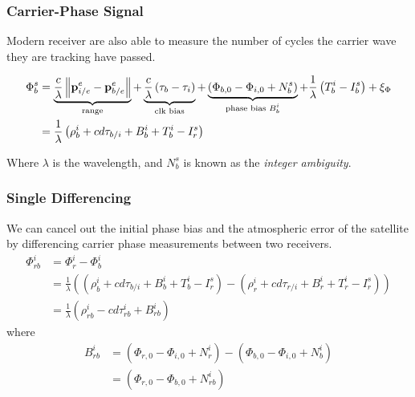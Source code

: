 \documentclass{beamer}
\newcommand{\norm}[1]{\left\lVert#1\right\rVert}
\begin{document}
\begin{frame}\frametitle{Carrier-Phase Signal}
Modern receiver are also able to measure the number of cycles the carrier wave they are tracking have passed.

\begin{align}
\Phi_{b}^s&=\underbrace{\frac{c}{\lambda}\norm{\p_{i/e}^{e}-\p_{b/e}^{e}}}_{\text{range}}+\underbrace{\frac{c}{\lambda}\left(\tau_{b}-\tau_{i}\right)}_{\text{clk bias}}+\underbrace{\left(\Phi_{b,0}-\Phi_{i,0}+N_{b}^{s}\right)}_{\text{phase bias $B_{b}^{i}$}}+\frac{1}{\lambda}\left(T_b^i - I_b^s\right) + \xi_{\Phi} \\
&= \frac{1}{\lambda}\left( \rho_b^i + cd\tau_{b/i} + B_b^i + T_b^i - I_r^s \right) 
\end{align}

Where $\lambda$ is the wavelength, and $N_{b}^{s}$ is known as the \emph{integer ambiguity}.
\end{frame}

\begin{frame}\frametitle{Single Differencing}
We can cancel out the initial phase bias and the atmospheric error of the satellite by differencing carrier phase measurements between two receivers.
\begin{align*}
	\Phi_{rb}^{i} &=\Phi_{r}^{i}-\Phi_{b}^{i} \nonumber\\
	&= \frac{1}{\lambda}\left( \left(\rho_b^i + cd\tau_{b/i} + B_b^i + T_b^i - I_r^s\right)- \left(\rho_r^i + cd\tau_{r/i} + B_r^i + T_r^i - I_r^s \right)\right) \nonumber\\
	&= \frac{1}{\lambda} \left(\rho_{rb}^i -cd\tau_{rb}^i + B_{rb}^i\right)
\end{align*}
where
\begin{align*}
B_{rb}^{i} & =\left(\Phi_{r,0}-\Phi_{i,0}+N_{r}^{i}\right)-\left(\Phi_{b,0}-\Phi_{i,0}+N_{b}^{i}\right)\\
 & =\left(\Phi_{r,0}-\Phi_{b,0}+N_{rb}^{i}\right)
\end{align*}
\end{frame}
\end{document}
